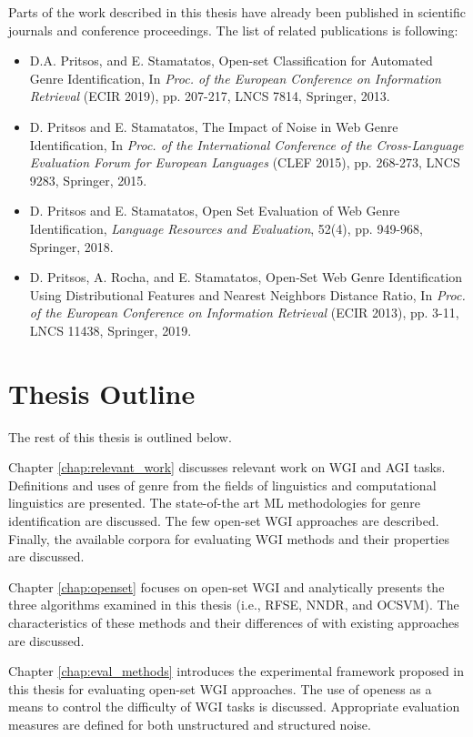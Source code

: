 Parts of the work described in this thesis have already been published in scientific journals and conference proceedings. The list of related publications is following:

\begin{itemize}
\item D.A. Pritsos, and E. Stamatatos, Open-set Classification for Automated Genre Identification, In \textit{Proc. of the European Conference on Information Retrieval} (ECIR 2019), pp. 207-217, LNCS 7814, Springer, 2013.
\item D. Pritsos and E. Stamatatos, The Impact of Noise in Web Genre Identification, In \textit{Proc. of the International Conference of the Cross-Language Evaluation Forum for European Languages} (CLEF 2015), pp. 268-273, LNCS  9283, Springer, 2015.
\item D. Pritsos and E. Stamatatos, Open Set Evaluation of Web Genre Identification, \textit{Language Resources and Evaluation}, 52(4), pp. 949-968, Springer, 2018.
\item D. Pritsos, A. Rocha, and E. Stamatatos, Open-Set Web Genre Identification Using Distributional Features and Nearest Neighbors Distance Ratio, In \textit{Proc. of the European Conference on Information Retrieval} (ECIR 2013), pp. 3-11, LNCS 11438, Springer, 2019.
\end{itemize}

\section{Thesis Outline} \label{chap:Introduction:sec:thesis_outline}

The rest of this thesis is outlined below. 

Chapter \ref{chap:relevant_work} discusses relevant work on WGI and AGI tasks. Definitions and uses of genre from the fields of linguistics and computational linguistics are presented. The state-of-the art ML methodologies for genre identification are discussed. The few open-set WGI approaches are described. Finally, the available corpora for evaluating WGI methods and their properties are discussed.

Chapter \ref{chap:openset} focuses on open-set WGI and analytically presents the three algorithms examined in this thesis (i.e., RFSE, NNDR, and OCSVM). The characteristics of these methods and their differences of with existing approaches are discussed.

Chapter \ref{chap:eval_methods} introduces the experimental framework proposed in this thesis for evaluating open-set WGI approaches. The use of openess as a means to control the difficulty of WGI tasks is discussed. Appropriate evaluation measures are defined for both unstructured and structured noise. 

